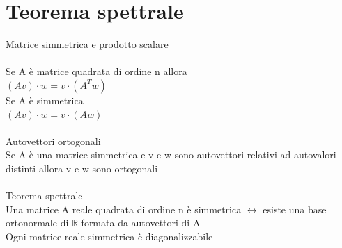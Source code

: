 \documentclass{article}
\begin{document}
\section{Teorema spettrale}
Matrice simmetrica e prodotto scalare\\\\
Se A è matrice quadrata di ordine n allora\\
\((Av)\cdot w = v\cdot (A^Tw)\)\\
Se A è simmetrica\\
\((Av)\cdot w = v\cdot (Aw)\)\\\\
Autovettori ortogonali\\
Se A è una matrice simmetrica e v e w sono autovettori relativi ad autovalori distinti allora v e w sono ortogonali\\\\
{\Large Teorema spettrale}\\
Una matrice A reale quadrata di ordine n è simmetrica \(\leftrightarrow\) esiste una base ortonormale di \(\mathbb{R}\) formata da autovettori di A\\
Ogni matrice reale simmetrica è diagonalizzabile\\\\\\
\end{document}

